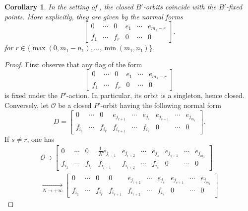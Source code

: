 \documentclass[pdftex]{sigma}
\numberwithin{equation}{section}
\theoremstyle{definition}
\theoremstyle{plain}
\theoremstyle{plain}
\theoremstyle{plain}
\theoremstyle{plain}
\newtheorem{corollaryxx}{Corollary}
\begin{document}
\setcounter{corollaryxx}{2}
\begin{corollaryxx}
	In the setting of , the closed $B'$-orbits coincide with the $B'$-fixed points. More explicitly, they are given by the normal forms
	\begin{equation*}
		\begin{bmatrix}
		0 & \cdots & 0 & e_{1} & \cdots & e_{m_1-r} \\
		f_1 & \cdots & f_r & 0 & \cdots & 0
	\end{bmatrix}.
	\end{equation*}
	for $r \in \{\max(0,m_1-n_1),\dots,\min(m_1,n_1)\}$.
\end{corollaryxx}
\begin{proof}
	First observe that any flag of the form
	\begin{equation*}
		\begin{bmatrix}
		0 & \cdots & 0 & e_{1} & \cdots & e_{m_1-r} \\
		f_1 & \cdots & f_r & 0 & \cdots & 0
	\end{bmatrix}
	\end{equation*}
	is fixed under the $P'$-action. In particular, its orbit is a singleton, hence closed. \\
	Conversely, let $\mathcal O$ be a closed $P'$-orbit having the following normal form
	\begin{equation*}
		D = \begin{bmatrix}
		0 & \cdots & 0  & e_{j_{r+1}} & \cdots & e_{j_{s}} & e_{j_{s+1}} & \cdots & e_{j_{m_1}} \\
		f_{i_1} & \cdots & f_{i_{r}}  & f_{i_{r+1}} & \cdots & f_{i_{s}} & 0 & \cdots & 0
	\end{bmatrix}.
	\end{equation*}
	If $s \neq r$, one has	
	\begin{multline*}
		\mathcal O \ni \begin{bmatrix}
			0 & \cdots & 0  & \frac{1}{N} e_{j_{r+1}} & e_{j_{r+2}} & \cdots & e_{j_{s}} & e_{j_{s+1}} & \cdots & e_{j_{m_1}} \\
			f_{i_1} & \cdots & f_{i_{r}}  & f_{i_{r+1}} & f_{i_{r+2}} & \cdots & f_{i_{s}} & 0 & \cdots & 0
		\end{bmatrix} \\
		\xrightarrow[N \to +\infty]{}\begin{bmatrix}
			0 & \cdots & 0  & 0 & e_{j_{r+2}} & \cdots & e_{j_{s}} & e_{j_{s+1}} & \cdots & e_{j_{m_1}} \\
			f_{i_1} & \cdots & f_{i_{r}}  & f_{i_{r+1}} & f_{i_{r+2}} & \cdots & f_{i_{s}} & 0 & \cdots & 0

\end{bmatrix}
\end{multline*}
\end{proof}
\end{document}
